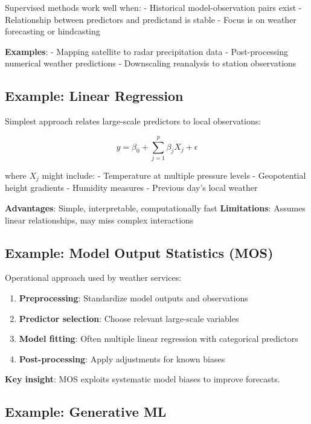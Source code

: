 \documentclass[
  letterpaper,
  DIV=11,
  numbers=noendperiod]{scrreprt}
\providecommand{\tightlist}{%
  \setlength{\itemsep}{0pt}\setlength{\parskip}{0pt}}
\begin{document}
Supervised methods work well when: - Historical model-observation pairs
exist - Relationship between predictors and predictand is stable - Focus
is on weather forecasting or hindcasting

\textbf{Examples}: - Mapping satellite to radar precipitation data -
Post-processing numerical weather predictions - Downscaling reanalysis
to station observations

\subsection{Example: Linear
Regression}\label{example-linear-regression-1}

Simplest approach relates large-scale predictors to local observations:

\[y = \beta_0 + \sum_{j=1}^p \beta_j X_j + \epsilon\]

where \(X_j\) might include: - Temperature at multiple pressure levels -
Geopotential height gradients - Humidity measures - Previous day's local
weather

\textbf{Advantages}: Simple, interpretable, computationally fast
\textbf{Limitations}: Assumes linear relationships, may miss complex
interactions

\subsection{Example: Model Output Statistics
(MOS)}\label{example-model-output-statistics-mos}

Operational approach used by weather services:

\begin{enumerate}
\def\labelenumi{\arabic{enumi}.}
\tightlist
\item
  \textbf{Preprocessing}: Standardize model outputs and observations
\item
  \textbf{Predictor selection}: Choose relevant large-scale variables
\item
  \textbf{Model fitting}: Often multiple linear regression with
  categorical predictors
\item
  \textbf{Post-processing}: Apply adjustments for known biases
\end{enumerate}

\textbf{Key insight}: MOS exploits systematic model biases to improve
forecasts.

\subsection{Example: Generative ML}\label{example-generative-ml}
\end{document}
